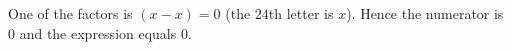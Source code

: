 One of the factors is $(x-x)=0$ (the $24$th letter is $x$). Hence the numerator is $0$ and the expression equals $\boxed{0}$.
